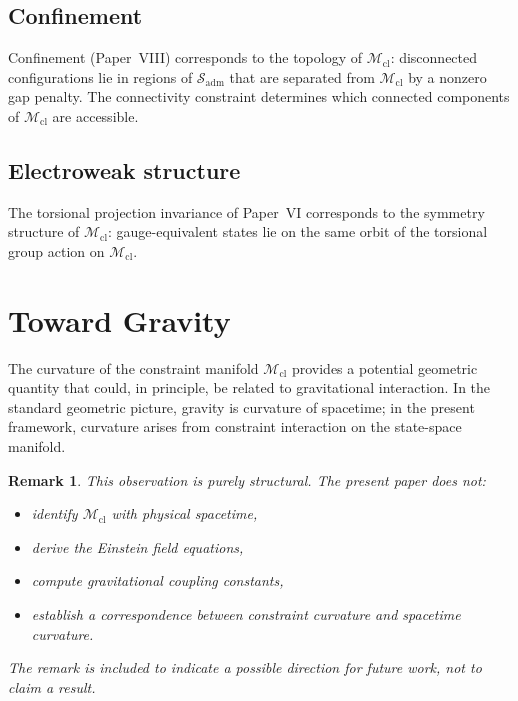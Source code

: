 \documentclass[12pt]{article}
\newtheorem{remark}[theorem]{Remark}
\newcommand{\Mcl}{\mathcal{M}_{\mathrm{cl}}}
\newcommand{\Sadm}{\mathcal{S}_{\mathrm{adm}}}
\begin{document}
\subsection{Confinement}

Confinement (Paper~VIII) corresponds to the topology of $\Mcl$: disconnected configurations lie in regions of $\Sadm$ that are separated from $\Mcl$ by a nonzero gap penalty. The connectivity constraint determines which connected components of $\Mcl$ are accessible.

\subsection{Electroweak structure}

The torsional projection invariance of Paper~VI corresponds to the symmetry structure of $\Mcl$: gauge-equivalent states lie on the same orbit of the torsional group action on $\Mcl$.

\section{Toward Gravity}\label{sec:gravity}

The curvature of the constraint manifold $\Mcl$ provides a potential geometric quantity that could, in principle, be related to gravitational interaction. In the standard geometric picture, gravity is curvature of spacetime; in the present framework, curvature arises from constraint interaction on the state-space manifold.

\begin{remark}
This observation is purely structural. The present paper does not:
\begin{itemize}
    \item identify $\Mcl$ with physical spacetime,
    \item derive the Einstein field equations,
    \item compute gravitational coupling constants,
    \item establish a correspondence between constraint curvature and spacetime curvature.
\end{itemize}
The remark is included to indicate a possible direction for future work, not to claim a result.
\end{remark}

\end{document}
